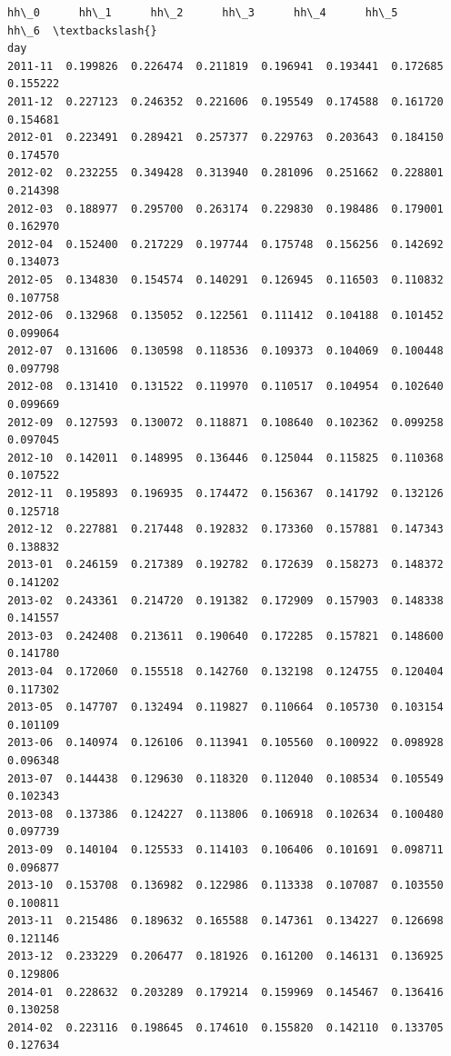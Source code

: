 \documentclass[11pt]{article}
\makeatletter
\newcommand{\boxspacing}{\kern\kvtcb@left@rule\kern\kvtcb@boxsep}
\newcommand{\prompt}[4]{
        {\ttfamily\llap{{\color{#2}[#3]:\hspace{3pt}#4}}\vspace{-\baselineskip}}
    }
\makeatother
\begin{document}
            \begin{tcolorbox}[breakable, size=fbox, boxrule=.5pt, pad at break*=1mm, opacityfill=0]
\prompt{Out}{outcolor}{66}{\boxspacing}
\begin{Verbatim}[commandchars=\\\{\}]
             hh\_0      hh\_1      hh\_2      hh\_3      hh\_4      hh\_5      hh\_6  \textbackslash{}
day
2011-11  0.199826  0.226474  0.211819  0.196941  0.193441  0.172685  0.155222
2011-12  0.227123  0.246352  0.221606  0.195549  0.174588  0.161720  0.154681
2012-01  0.223491  0.289421  0.257377  0.229763  0.203643  0.184150  0.174570
2012-02  0.232255  0.349428  0.313940  0.281096  0.251662  0.228801  0.214398
2012-03  0.188977  0.295700  0.263174  0.229830  0.198486  0.179001  0.162970
2012-04  0.152400  0.217229  0.197744  0.175748  0.156256  0.142692  0.134073
2012-05  0.134830  0.154574  0.140291  0.126945  0.116503  0.110832  0.107758
2012-06  0.132968  0.135052  0.122561  0.111412  0.104188  0.101452  0.099064
2012-07  0.131606  0.130598  0.118536  0.109373  0.104069  0.100448  0.097798
2012-08  0.131410  0.131522  0.119970  0.110517  0.104954  0.102640  0.099669
2012-09  0.127593  0.130072  0.118871  0.108640  0.102362  0.099258  0.097045
2012-10  0.142011  0.148995  0.136446  0.125044  0.115825  0.110368  0.107522
2012-11  0.195893  0.196935  0.174472  0.156367  0.141792  0.132126  0.125718
2012-12  0.227881  0.217448  0.192832  0.173360  0.157881  0.147343  0.138832
2013-01  0.246159  0.217389  0.192782  0.172639  0.158273  0.148372  0.141202
2013-02  0.243361  0.214720  0.191382  0.172909  0.157903  0.148338  0.141557
2013-03  0.242408  0.213611  0.190640  0.172285  0.157821  0.148600  0.141780
2013-04  0.172060  0.155518  0.142760  0.132198  0.124755  0.120404  0.117302
2013-05  0.147707  0.132494  0.119827  0.110664  0.105730  0.103154  0.101109
2013-06  0.140974  0.126106  0.113941  0.105560  0.100922  0.098928  0.096348
2013-07  0.144438  0.129630  0.118320  0.112040  0.108534  0.105549  0.102343
2013-08  0.137386  0.124227  0.113806  0.106918  0.102634  0.100480  0.097739
2013-09  0.140104  0.125533  0.114103  0.106406  0.101691  0.098711  0.096877
2013-10  0.153708  0.136982  0.122986  0.113338  0.107087  0.103550  0.100811
2013-11  0.215486  0.189632  0.165588  0.147361  0.134227  0.126698  0.121146
2013-12  0.233229  0.206477  0.181926  0.161200  0.146131  0.136925  0.129806
2014-01  0.228632  0.203289  0.179214  0.159969  0.145467  0.136416  0.130258
2014-02  0.223116  0.198645  0.174610  0.155820  0.142110  0.133705  0.127634


\end{Verbatim}
\end{tcolorbox}
\end{document}
